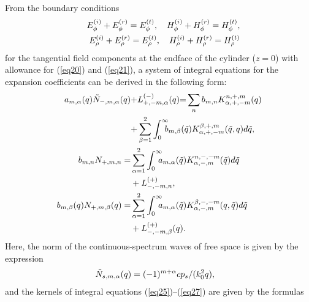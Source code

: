 \documentclass[conference,a4paper]{IEEEtran}
\begin{document}
From the boundary conditions
\begin{eqnarray}\label{eq24}
&&{E}^{(i)}_{\phi}+{E}^{(r)}_{\phi}={E}^{(t)}_{\phi},\quad {H}^{(i)}_{\phi}+{H}^{(r)}_{\phi}={H}^{(t)}_{\phi},\nonumber\\
&&{E}^{(i)}_{\rho}+{E}^{(r)}_{\rho}={E}^{(t)}_{\rho},\quad {H}^{(i)}_{\rho}+{H}^{(r)}_{\rho}={H}^{(t)}_{\rho}
\end{eqnarray}
for the tangential field components at the endface of the cylinder ($z=0$) with allowance for (\ref{eq20}) and (\ref{eq21}), a system of integral equations for the expansion coefficients can be derived in the following form:
\begin{align}
{a}_{m,{\a}}({q}){\tilde N}_{-,m,{\a}}({q})&{+}L_{+ ,-m,\alpha}^{(-)}(q) {=}\sum\limits_{n} {b}_{m,n} {K}^{n,+,m}_{{\a},+,-m}({q})\notag\\
& {+}\sum\limits_{\b=1}^{2}\int_{0}^{\infty}\!\!\!\!{b}_{m,\b}(\tilde{q}){K}^{\b,+,m}_{{\a},+,-m}(\tilde{q},{q}){d}\tilde{q},\label{eq25}\\
{b}_{m,n}{N}_{+,m,n}=&\sum\limits_{\a=1}^{2}\int_{0}^{\infty}\!\!\!\!{a}_{m,\a}(\tilde{q}){K}^{n,-,-m}_{\a,-,m}(\tilde{q}){d}\tilde{q}\notag\\
&+L_{- ,-m,n}^{(+)},\label{eq26}\\
{b}_{m,\b}(q){N}_{+,m,\b}(q)=&\sum\limits_{\a=1}^{2}\int_{0}^{\infty}\!\!\!\!{a}_{m,\a}(\tilde{q}){K}^{\b,-,-m}_{\a,-,m}(q,\tilde{q}){d}\tilde{q}\nonumber\\
&+L_{- ,-m,\b}^{(+)}(q).\label{eq27}
\end{align}
Here, the norm of the continuous-spectrum waves of free space is given by the expression
\begin{eqnarray}\label{eq28}
&& \hspace{-7mm} {\tilde N}_{s,m,{\a}}({q})=(-1)^{m+\alpha}{c}{p_s}/({k_0^2}{q}),
\end{eqnarray}
and the kernels of integral equations (\ref{eq25})--(\ref{eq27}) are given by the formulas
\end{document}
